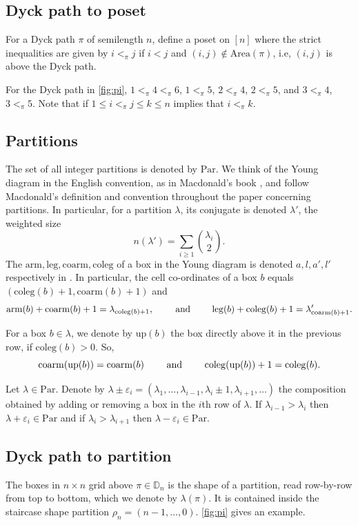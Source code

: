 \documentclass[12pt,reqno]{amsart}
\theoremstyle{plain}
\theoremstyle{definition}
\theoremstyle{remark}
\theoremstyle{example}
\numberwithin{equation}{section}
\newcommand\Par{\mathrm{Par}}
\newcommand\up{\mathrm{up}}
\newcommand\arm{\mathrm{arm}}
\newcommand\leg{\mathrm{leg}}
\newcommand{\coleg}{\mathrm{coleg}}
\newcommand{\coarm}{\mathrm{coarm}}
\newcommand{\Area}{\mathrm{Area}}
\newcommand{\DD}{\mathbb{D}}
\begin{document}
\subsection{Dyck path to poset}

For a Dyck path $\pi$ of semilength $n$, define a poset on $[n]$ where the strict inequalities are given by $i<_\pi j$ if $i<j$ and $(i,j) \notin \Area(\pi)$, i.e, $(i,j)$ is above the Dyck path.

For the Dyck path in \autoref{fig:pi}, $1 <_\pi 4 <_\pi 6$, $1 <_\pi 5$, $2 <_\pi 4$, $2 <_\pi 5$, and $3<_\pi 4$, $3 <_\pi 5$. Note that if $1 \leq i <_\pi j \leq k \leq n$ implies that $i<_\pi k$.

\subsection{Partitions}The set of all integer partitions is denoted by $\Par$. We think of the Young diagram in the English convention, as in Macdonald's book \cite{MacMainBook}, and follow Macdonald's definition and convention throughout the paper concerning partitions. In particular, for a partition $\lambda$, its conjugate is denoted $\lambda'$, the weighted size $$ n(\lambda') = \sum_{i \geq 1} \binom{\lambda_i}{2}.$$  The $\arm, \leg, \coarm, \coleg$ of a box in the Young diagram is denoted $a,l,a',l'$ respectively in \cite{MacMainBook}. In particular, the cell co-ordinates of a box $b$ equals $(\coleg(b)+1,\coarm(b)+1)$ and $$\arm(b)+\coarm(b)+1 = \lambda_{\coleg(b)+1}, \qquad \hbox{ and } \qquad \leg(b)+\coleg(b)+1 = \lambda'_{\coarm(b)+1}.$$ 

For a box $b \in \lambda$, we denote by $\up(b)$ the box directly above it in the previous row, if $\coleg(b)>0$. So, $$ \coarm(\up(b)) = \coarm(b) \qquad \hbox{ and } \qquad \coleg(\up(b))+1 = \coleg(b). $$ 

Let $\lambda \in \Par$. Denote by $\lambda \pm \varepsilon_i = (\lambda_1,\ldots,\lambda_{i-1},\lambda_i \pm 1, \lambda_{i+1},\ldots)$ the composition obtained by adding or removing a box in the $i$th row of $\lambda$. If $\lambda_{i-1}>\lambda_i$ then $\lambda+\varepsilon_i \in \Par$ and if $\lambda_i > \lambda_{i+1}$ then $\lambda- \varepsilon_i \in \Par$.


\subsection{Dyck path to partition}

The boxes in $n\times n$ grid above $\pi \in \DD_n$ is the shape of a partition, read row-by-row from top to bottom, which we denote by $\lambda(\pi)$. It is contained inside the staircase shape partition $\rho_n = (n-1,\ldots,0)$. \autoref{fig:pi} gives an example.
\end{document}
